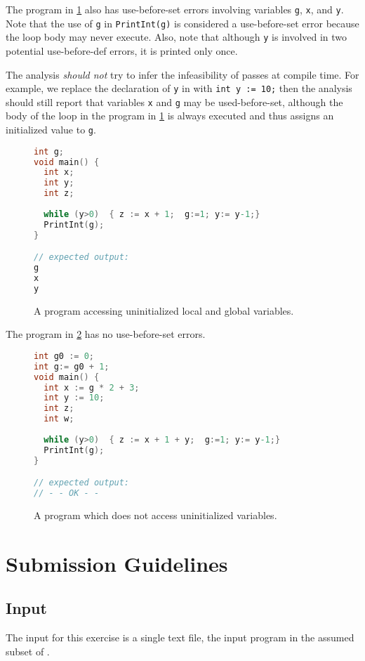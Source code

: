 \documentclass{article}
\begin{document}
The program in \cref{fig:example-loop} also has use-before-set errors involving variables
\texttt{g}, \texttt{x}, and \texttt{y}.
Note that the use of \texttt{g} in \texttt{PrintInt(g)} is considered a use-before-set error because the loop body may never execute.
Also, note that although \texttt{y} is involved in two potential use-before-def errors, it is printed only once.

The analysis \emph{should not} try to infer the infeasibility of passes at compile time. For example, we replace the declaration of \texttt{y} in  with 
\texttt{int y := 10;}
then the analysis should still report that variables \texttt{x} and \texttt{g} may be used-before-set, although the body of the loop in the program in \cref{fig:example-loop} is always executed and thus assigns an initialized value to \texttt{g}.

\begin{figure}
\centering
\begin{lstlisting}[language=C]
int g;
void main() {
  int x;
  int y;
  int z;
  
  while (y>0)  { z := x + 1;  g:=1; y:= y-1;}
  PrintInt(g);
}

// expected output:
g
x
y
\end{lstlisting}
\caption{A program accessing uninitialized local and global variables.}
\label{fig:example-loop}
\end{figure} 

The program in \cref{fig:example-ok}  has no use-before-set errors. 

\begin{figure}
\centering
\begin{lstlisting}[language=C]
int g0 := 0;
int g:= g0 + 1;
void main() {
  int x := g * 2 + 3;
  int y := 10;
  int z;
  int w;
  
  while (y>0)  { z := x + 1 + y;  g:=1; y:= y-1;}
  PrintInt(g);
}

// expected output:
// - - OK - -
\end{lstlisting}
\caption{A program which does not access uninitialized variables.}
\label{fig:example-ok}
\end{figure} 

\section{Submission Guidelines}
 
\subsection{Input}
The input for this exercise is a single text file, the input program in the assumed subset of  \plname.
\end{document}
